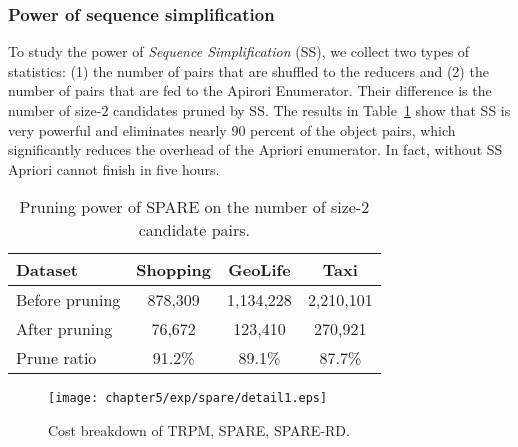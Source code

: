 \subsubsection{Power of sequence simplification}
To study the power of \emph{Sequence Simplification} (SS),
we collect two types of statistics: (1) the number of pairs that
are shuffled to the reducers and (2) the number of pairs that
are fed to the Apirori Enumerator. 
Their difference %
is the number of size-$2$ candidates pruned by SS.
The results in Table~\ref{tbl:pruning} show that %
SS is very powerful and eliminates nearly 90 percent of the object pairs, 
which significantly reduces the overhead of %
the Apriori enumerator.
In fact, without SS Apriori cannot
finish in five hours.



\begin{table}[h]
\centering
\begin{tabular}{|l|c|c|c|}
\hline 
\textbf{Dataset} & \textbf{Shopping} & \textbf{GeoLife} & \textbf{Taxi} \\ 
\hline 
Before pruning & 878,309 &  1,134,228 & 2,210,101 \\ 
\hline 
After pruning & 76,672 & 123,410 & 270,921 \\ 
\hline 
Prune ratio & 91.2\% & 89.1\% & 87.7\% \\ 
\hline 
\end{tabular} 
\caption{Pruning power of SPARE on the number of size-2 candidate pairs.}
\label{tbl:pruning}
\end{table}

\begin{figure}[h]
\centering
\texttt{[image: chapter5/exp/spare/detail1.eps]}
    \caption{Cost breakdown of TRPM, SPARE, SPARE-RD.}
  \label{exp:wl}
\end{figure}

